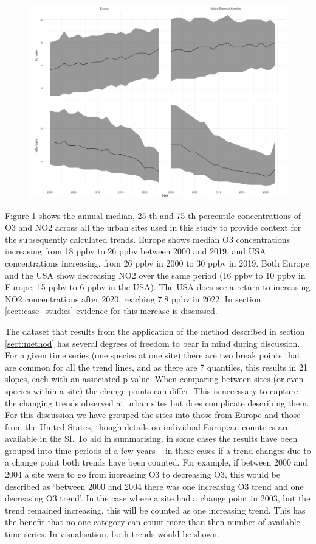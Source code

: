 \documentclass[journal abbreviation, manuscript]{copernicus}
\begin{document}
\begin{figure}[t]
\includegraphics[width=12cm]{plots/o3_no2_conc.png}
\caption{}
\label{fig:conc_plot}
\end{figure}

Figure \ref{fig:conc_plot} shows the annual median, 25 th and 75 th percentile concentrations of O3 and NO2 across all the urban sites used in this study to provide context for the subsequently calculated trends. Europe shows median O3 concentrations increasing from 18 ppbv to 26 ppbv between 2000 and 2019, and USA concentrations increasing, from 26 ppbv in 2000 to 30 ppbv in 2019. Both Europe and the USA show decreasing NO2 over the same period (16 ppbv to 10 ppbv in Europe, 15 ppbv to 6 ppbv in the USA). The USA does see a return to increasing NO2 concentrations after 2020, reaching 7.8 ppbv in 2022. In section \ref{sect:case_studies} evidence for this increase is discussed. 

The dataset that results from the application of the method described in section \ref{sect:method} has several degrees of freedom to bear in mind during discussion. For a given time series (one species at one site) there are two break points that are common for all the trend lines, and as there are 7 quantiles, this results in 21 slopes, each with an associated p-value. When comparing between sites (or even species within a site) the change points can differ. This is necessary to capture the changing trends observed at urban sites but does complicate describing them. For this discussion we have grouped the sites into those from Europe and those from the United States, though details on individual European countries are available in the SI. 
To aid in summarising, in some cases the results have been grouped into time periods of a few years – in these cases if a trend changes due to a change point both trends have been counted. For example, if between 2000 and 2004 a site were to go from increasing O3 to decreasing O3, this would be described as ‘between 2000 and 2004 there was one increasing O3 trend and one decreasing O3 trend’. In the case where a site had a change point in 2003, but the trend remained increasing, this will be counted as one increasing trend. This has the benefit that no one category can count more than then number of available time series. In visualisation, both trends would be shown.
\end{document}
